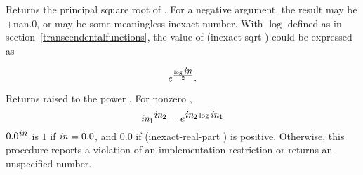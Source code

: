 \begin{entry}{%
}

Returns the principal square root of . For a negative argument,
the result may be {\cf +nan.0}, or may be some meaningless inexact
number.  With $\log$ defined as in
section~\ref{transcendentalfunctions}, the value of {\cf (inexact-sqrt
  )} could be expressed as

\begin{displaymath}
e^{\frac{\log \var{in}}{2}}.
\end{displaymath}
\end{entry}

\begin{entry}{%
}

Returns  raised to the power .  For nonzero
,
%
\begin{displaymath}
  \vari{in}^{\varii{in}} = e^{\varii{in} \log \vari{in}}
\end{displaymath}
%
$0.0^{\var{in}}$ is $1$ if $\var{in} = 0.0$, and $0.0$ if {\cf
  (inexact-real-part )} is positive.  Otherwise, this
procedure reports a violation of an implementation restriction or
returns an unspecified number.
\end{entry}

